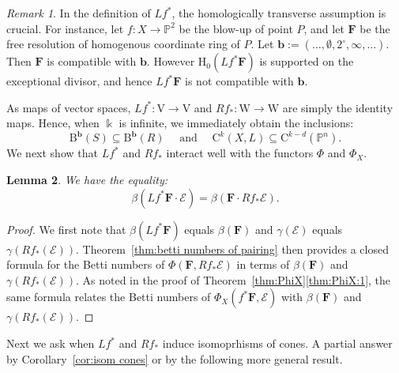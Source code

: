 \documentclass[12pt]{amsart}
\newtheorem{lemma}{Lemma}[section]
\theoremstyle{definition}
\theoremstyle{remark}
\newtheorem{remark}[lemma]{Remark}
\newcommand{\kk}{\Bbbk}
\newcommand{\PP}{\mathbb{P}}
\newcommand{\HH}{\mathrm{H}}
\newcommand{\VV}{\mathrm{V}}
\newcommand{\WW}{\mathrm{W}}
\newcommand{\bb}{\mathbf{b}}
\newcommand{\cO}{\mathcal{O}}
\newcommand{\cE}{\mathcal{E}}
\newcommand{\FF}{\mathbf{F}}
\newcommand{\zp}{\circ}
\newcommand{\CQ}{\mathrm{C}}
\newcommand{\BBQ}{\mathrm{B}}
\begin{document}
\begin{remark}
In the definition of $Lf^*$, the homologically transverse assumption is crucial.  For instance, let $f: X\to \PP^2$ be the blow-up of point $P$, and let $\FF$ be the free resolution of homogenous coordinate ring of $P$.  Let $\bb:=(\dots,\emptyset, 2^\zp,\infty,\dots)$.  Then $\FF$ is compatible with $\bb$.  However $\HH_0(Lf^*\FF)$ is supported on the exceptional divisor, and hence $Lf^*\FF$ is not compatible with $\bb$.
\end{remark}

As maps of vector spaces, $Lf^*\colon \VV\to \VV$ and $Rf_*\colon \WW\to \WW$ are simply the identity maps.  Hence, when $\kk$ is infinite, we immediately obtain the inclusions:
\[
\BBQ^{\bb}(S)\subseteq \BBQ^{\bb}(R) \quad \text{ and } \quad \CQ^k(X,L)\subseteq \CQ^{k-d}(\PP^n).
\]
We next show that $Lf^*$ and $Rf_*$ interact well with the functors $\Phi$ and $\Phi_X$.

\begin{lemma}\label{lem:general pairing}
We have the equality:
\[
\beta(Lf^*\FF\cdot \cE)=\beta(\FF\cdot Rf_*\cE).
\]
\end{lemma}
\begin{proof}
We first note that $\beta(Lf^*\FF)$ equals $\beta(\FF)$ and $\gamma(\cE)$ equals $\gamma(Rf_*(\cE))$.  Theorem~\ref{thm:betti numbers of pairing} then provides a closed formula for the Betti numbers of $\Phi(\FF,Rf_*\cE)$ in terms of $\beta(\FF)$ and $\gamma(Rf_*(\cE))$.  As noted in the proof of Theorem~\ref{thm:PhiX}\eqref{thm:PhiX:1}, the same formula relates the Betti numbers of $\Phi_X(f^*\FF,\cE)$ with  $\beta(\FF)$ and $\gamma(Rf_*(\cE))$.
\end{proof}


%
Next we ask when $Lf^*$ and $Rf_*$ induce isomoprhisms of cones.  A partial answer by Corollary~\ref{cor:isom cones} or by the following more general result.
\end{document}
